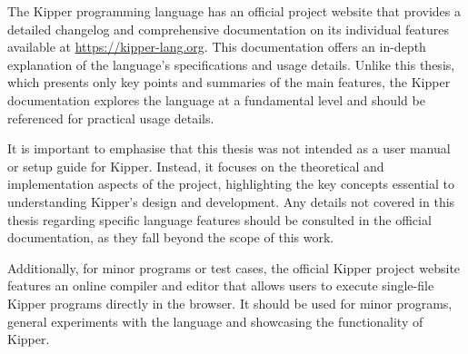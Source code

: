 
The Kipper programming language has an official project website that provides a detailed changelog and comprehensive documentation on its individual features available at \url{https://kipper-lang.org}. This documentation offers an in-depth explanation of the language’s specifications and usage details. Unlike this thesis, which presents only key points and summaries of the main features, the Kipper documentation explores the language at a fundamental level and should be referenced for practical usage details.

It is important to emphasise that this thesis was not intended as a user manual or setup guide for Kipper. Instead, it focuses on the theoretical and implementation aspects of the project, highlighting the key concepts essential to understanding Kipper’s design and development. Any details not covered in this thesis regarding specific language features should be consulted in the official documentation, as they fall beyond the scope of this work.

Additionally, for minor programs or test cases, the official Kipper project website features an online compiler and editor that allows users to execute single-file Kipper programs directly in the browser. It should be used for minor programs, general experiments with the language and showcasing the functionality of Kipper.

